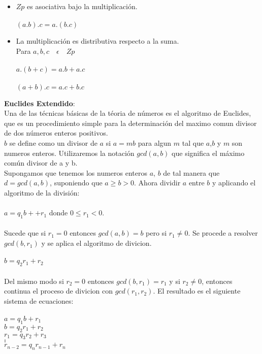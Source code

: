 \begin{itemize}
 \item $Zp$ es asociativa bajo la multiplicación.\\\\
 $(a . b) . c  =  a . (b . c)$
 \item La multiplicación es distributiva respecto a la suma.\\
 Para $a,b,c\quad\epsilon\quad Zp$\\\\
 $a.(b+c)=a.b+a.c$\\\\
 $(a+b).c=a.c+b.c$
\end{itemize}


\textbf{Euclides Extendido}:\\
Una de las técnicas básicas de la téoria de números es el algoritmo de Euclides, que es un procedimiento simple para la determinación del maximo comun 	divisor de dos números enteros positivos.\\
$b$ se define como un divisor de $a$ si $a=mb$ para algun $m$ tal que $a$,$b$ y $m$ son numeros enteros.
Utilizaremos la notación $gcd (a, b)$ que significa el máximo común divisor de a y b.\\
Supongamos que tenemos los numeros enteros $a$, $b$ de tal manera que $d=gcd(a,b)$, suponiendo que $a\geq b > 0$. Ahora dividir $a$ entre $b$ y aplicando el algoritmo de la división:\\\\
$a=q_1b++r_1$   donde $0\leq r_1<0$.\\\\
Sucede que si $r_1=0$ entonces $gcd(a,b)=b$ pero si $r_1\neq 0$. Se procede a resolver $gcd(b,r_1)$ y se aplica el algoritmo de divicion.\\\\
$b=q_2r_1+r_2$\\\\
Del mismo modo si $r_2=0$ entonces $gcd(b,r_1)=r_1$ y si $r_2\neq 0$, entonces continua el proceso de divicion con $gcd(r_1,r_2)$. El resultado es el siguiente sistema de ecuaciones:\\\\
$a=q_1b+r_1$\\
$b=q_2r_1+r_2$\\
$r_1=q_3r_2+r_3$\\
$.$\\
$.$\\
$.$\\
$r_{n-2}=q_nr_{n-1}+r_n$\\

